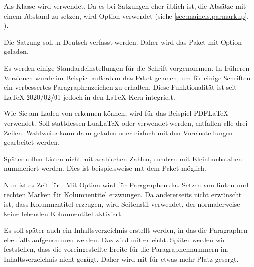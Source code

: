 %
Als Klasse wird  verwendet. Da es bei Satzungen eher üblich
ist, die Absätze mit einem Abstand zu setzen, wird Option
 verwendet (siehe
\autoref{sec:maincls.parmarkup}, ).

%
Die Satzung soll in Deutsch verfasst werden. Daher wird das Paket
 mit Option  geladen.

%
Es werden einige Standardeinstellungen für die Schrift vorgenommen. In
früheren Versionen wurde im Beispiel außerdem das Paket 
geladen, um für einige Schriften ein verbessertes Paragraphenzeichen zu
erhalten. Diese Funktionalität ist seit \LaTeX{} 2020/02/01 jedoch in den
\LaTeX-Kern integriert.

Wie Sie am Laden von  erkennen können, wird für das Beispiel
PDF\LaTeX{} verwendet. Soll stattdessen Lua\LaTeX{} oder \XeLaTeX{} verwendet
werden, entfallen alle drei Zeilen. Wahlweise kann dann 
geladen oder einfach mit den Voreinstellungen gearbeitet werden.

%
Später sollen Listen nicht mit arabischen Zahlen, sondern mit Kleinbuchstaben
nummeriert werden. Dies ist beispielsweise mit dem Paket 
möglich.

%
Nun ist es Zeit für . Mit Option
 wird für Paragraphen das
Setzen von linken und rechten Marken für Kolumnentitel erzwungen. Da
andererseits nicht erwünscht ist, dass 
Kolumnentitel erzeugen, wird Seitenstil  verwendet, der
normalerweise keine lebenden Kolumnentitel aktiviert.

Es soll später auch ein Inhaltsverzeichnis erstellt werden, in das die
Paragraphen ebenfalls aufgenommen werden. Das wird mit
 erreicht. Später werden wir feststellen,
dass die voreingestellte Breite für die Paragraphennummern im
Inhaltsverzeichnis nicht genügt. Daher wird mit
 für etwas mehr Platz
gesorgt.

